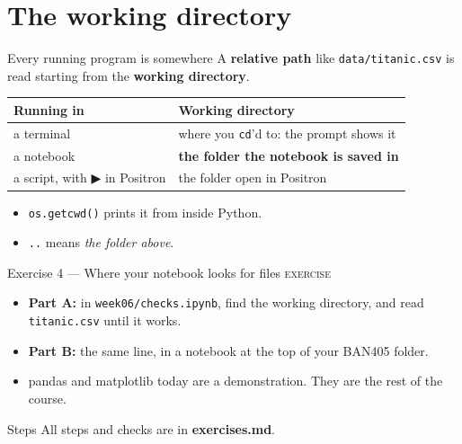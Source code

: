 \documentclass[aspectratio=169,11pt]{beamer}
\newcommand{\code}[1]{\texttt{#1}}
\newcommand{\key}[1]{\textbf{\textcolor{ban}{#1}}}
\newcommand{\exerciseframe}[3]{%
  \begin{frame}[t]{#1}
    \vspace{0.4em}
    {\small\textcolor{softgray}{\textsc{exercise}}}\par\vspace{0.6em}
    #2
    \vfill
    \begin{block}{Steps}
      All steps and checks are in \key{exercises.md}. #3
    \end{block}
    \vspace{0.6em}
  \end{frame}}
\begin{document}
\section{The working directory}

\begin{frame}{Every running program is somewhere}
  A \key{relative path} like \code{data/titanic.csv} is read starting from the \key{working directory}.
  \vspace{0.8em}

  \centering
  \begin{tabular}{l l}
    \textbf{Running in} & \textbf{Working directory} \\ \hline
    a terminal & where you \code{cd}'d to: the prompt shows it \\
    a notebook & \key{the folder the notebook is saved in} \\
    a script, with ▶ in Positron & the folder open in Positron \\
  \end{tabular}

  \vspace{1em}
  \raggedright
  \begin{itemize}
    \item \code{os.getcwd()} prints it from inside Python.
    \item \code{..} means \emph{the folder above}.
  \end{itemize}
\end{frame}

\exerciseframe{Exercise 4 --- Where your notebook looks for files}{%
  \begin{itemize}
    \item \textbf{Part A:} in \code{week06/checks.ipynb}, find the working directory, and read \code{titanic.csv} until it works.
    \item \textbf{Part B:} the same line, in a notebook at the top of your BAN405 folder.
    \item pandas and matplotlib today are a demonstration. They are the rest of the course.
  \end{itemize}}{}
\end{document}
